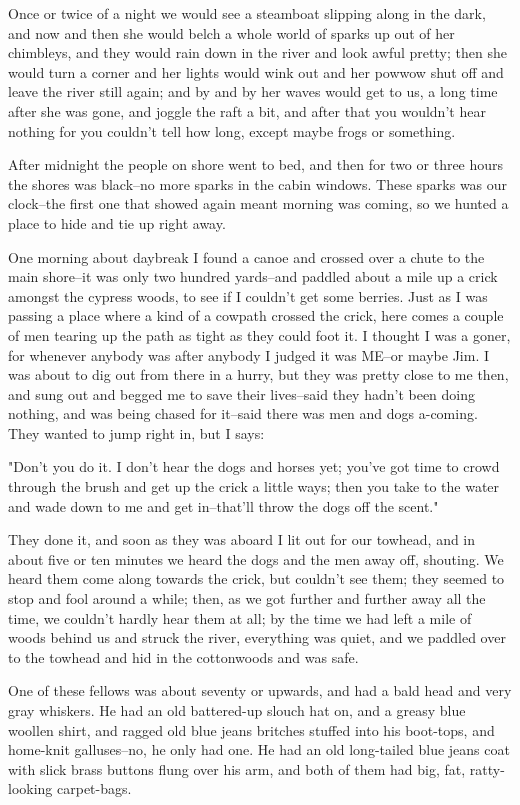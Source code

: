Once or twice of a night we would see a steamboat slipping along in the
dark, and now and then she would belch a whole world of sparks up out of
her chimbleys, and they would rain down in the river and look awful
pretty; then she would turn a corner and her lights would wink out and
her powwow shut off and leave the river still again; and by and by her
waves would get to us, a long time after she was gone, and joggle the
raft a bit, and after that you wouldn't hear nothing for you couldn't
tell how long, except maybe frogs or something.

After midnight the people on shore went to bed, and then for two or three
hours the shores was black--no more sparks in the cabin windows.  These
sparks was our clock--the first one that showed again meant morning was
coming, so we hunted a place to hide and tie up right away.

One morning about daybreak I found a canoe and crossed over a chute to
the main shore--it was only two hundred yards--and paddled about a mile
up a crick amongst the cypress woods, to see if I couldn't get some
berries. Just as I was passing a place where a kind of a cowpath crossed
the crick, here comes a couple of men tearing up the path as tight as
they could foot it.  I thought I was a goner, for whenever anybody was
after anybody I judged it was ME--or maybe Jim.  I was about to dig out
from there in a hurry, but they was pretty close to me then, and sung out
and begged me to save their lives--said they hadn't been doing nothing,
and was being chased for it--said there was men and dogs a-coming.  They
wanted to jump right in, but I says:

"Don't you do it.  I don't hear the dogs and horses yet; you've got time
to crowd through the brush and get up the crick a little ways; then you
take to the water and wade down to me and get in--that'll throw the dogs
off the scent."

They done it, and soon as they was aboard I lit out for our towhead, and
in about five or ten minutes we heard the dogs and the men away off,
shouting. We heard them come along towards the crick, but couldn't see
them; they seemed to stop and fool around a while; then, as we got
further and further away all the time, we couldn't hardly hear them at
all; by the time we had left a mile of woods behind us and struck the
river, everything was quiet, and we paddled over to the towhead and hid
in the cottonwoods and was safe.

One of these fellows was about seventy or upwards, and had a bald head
and very gray whiskers.  He had an old battered-up slouch hat on, and a
greasy blue woollen shirt, and ragged old blue jeans britches stuffed
into his boot-tops, and home-knit galluses--no, he only had one.  He had
an old long-tailed blue jeans coat with slick brass buttons flung over
his arm, and both of them had big, fat, ratty-looking carpet-bags.

